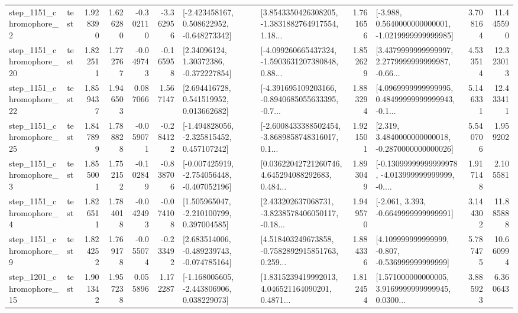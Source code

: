 \begin{tabular}{llrrrrllrlrr}
  step\_1151\_chromophore\_2 &      test &      1.928390 &    1.626280 &     -0.302110 & -3.362956 &   [-2.423458167, 0.508622952, -0.648273342] &  [3.8543350426308205, -1.3831882764917554, 1.18... &       1.761656 &  [-3.988, 0.5640000000000001, -1.0219999999999985] &            3.708164 &         11.445590 \\
 step\_1151\_chromophore\_20 &      test &      1.822511 &    1.772767 &     -0.049743 & -0.165958 &      [2.34096124, 1.30372386, -0.372227854] &  [-4.099260665437324, -1.5903631207380848, 0.88... &       1.852629 &  [3.4379999999999997, 2.2779999999999987, -0.66... &            4.533514 &         12.323013 \\
 step\_1151\_chromophore\_22 &      test &      1.859437 &    1.946503 &      0.087066 &  1.567147 &     [2.694416728, 0.541519952, 0.013662682] &  [-4.391695109203166, -0.8940685055633395, -0.7... &       1.883294 &  [4.0969999999999995, 0.48499999999999943, -0.1... &            5.146331 &         12.433411 \\
 step\_1151\_chromophore\_25 &      test &      1.847899 &    1.788828 &     -0.059071 & -0.284122 &   [-1.494828056, -2.325815452, 0.457107242] &  [-2.6008433388502454, -3.8689858748316017, 0.1... &       1.921501 &   [2.319, 3.4840000000000018, -0.2870000000000026] &            5.540706 &          1.959202 \\
  step\_1151\_chromophore\_3 &      test &      1.855001 &    1.752152 &     -0.102849 & -0.838706 &  [-0.007425919, -2.754056448, -0.407052196] &  [0.03622042721260746, 4.645294088292683, 0.484... &       1.893049 &  [-0.13099999999999978, -4.013999999999999, -0.... &            1.917148 &          2.105581 \\
  step\_1151\_chromophore\_4 &      test &      1.826511 &    1.784018 &     -0.042493 & -0.074108 &    [1.505965047, -2.210100799, 0.397004585] &  [2.433202637068731, -3.8238578406050117, -0.18... &       1.949570 &               [-2.061, 3.393, -0.6649999999999991] &            3.144302 &         11.885888 \\
  step\_1151\_chromophore\_9 &      test &      1.824252 &    1.769178 &     -0.055074 & -0.233492 &   [2.683514006, -0.489239743, -0.074785164] &  [4.518403249673858, -0.7582892915851763, 0.259... &       1.884336 &    [4.109999999999999, -0.807, -0.536999999999999] &            5.787475 &         10.660994 \\
 step\_1201\_chromophore\_15 &      test &      1.901342 &    1.957238 &      0.055896 &  1.172287 &   [-1.168005605, -2.443806906, 0.038229073] &  [1.8315239419992013, 4.046521164090201, 0.4871... &       1.812454 &  [1.571000000000005, 3.9169999999999945, 0.0300... &            3.885923 &          6.360643 \\

\end{tabular}
